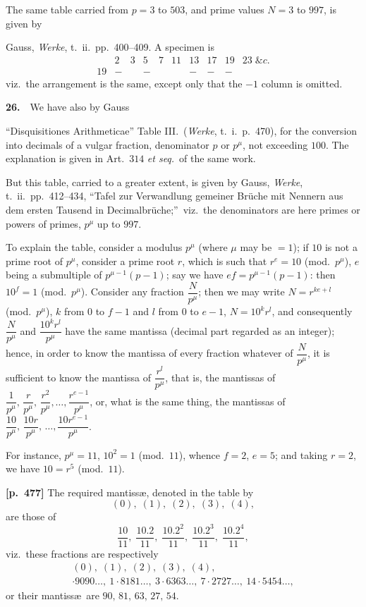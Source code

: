 \documentclass[11pt,a4paper]{article}
\begin{document}
The same table carried from $p=3$ to $503$, and prime values $N=3$ to $997$, is given by

Gauss, \textit{Werke}, t.~ii.\ pp.~400--409.   A specimen is
\[
\begin{array}{c|cccccccccc}
   & 2 & 3 & 5 & 7 & 11 & 13 & 17 & 19 & 23\;\&c. \\\hline
19 & - &   & - &   &    & -  & -  & -  &
\end{array}
\]
viz.\ the arrangement is the same, except only that the $-1$ column is omitted.

\textbf{26.}\ \ We have also by Gauss

``Disquisitiones Arithmeticae'' Table III.\ (\textit{Werke}, t.~i.\ p.~470), for the conversion into decimals of a vulgar fraction, denominator $p$ or $p^\mu$, not exceeding $100$.   The explanation is given in Art.\ $314$ \textit{et seq.}\ of the same work.

But this table, carried to a greater extent, is given by Gauss, \textit{Werke}, t.~ii.\ pp.~412--434, ``Tafel zur Verwandlung gemeiner Br\"uche mit Nennern aus dem ersten Tausend in Decimalbr\"uche;''\ viz.\ the denominators are here primes or powers of primes, $p^\mu$ up to $997$.

To explain the table, consider a modulus $p^\mu$ (where $\mu$ may be $=1$); if $10$ is not a prime root of $p^\mu$, consider a prime root $r$, which is such that $r^e=10$ (mod.\ $p^\mu$), $e$ being a submultiple of $p^{\mu-1}(p-1)$; say we have $ef=p^{\mu-1}(p-1)$: then $10^f=1$ (mod.\ $p^\mu$).   Consider any fraction $\dfrac{N}{p^\mu}$; then we may write $N=r^{ke+l}$ (mod.\ $p^\mu$), $k$ from $0$ to $f-1$ and $l$ from $0$ to $e-1$, $N=10^k r^l$, and consequently $\dfrac{N}{p^\mu}$ and $\dfrac{10^k r^l}{p^\mu}$ have the same mantissa (decimal part regarded as an integer); hence, in order to know the mantissa of every fraction whatever of $\dfrac{N}{p^\mu}$, it is sufficient to know the mantissa of $\dfrac{r^l}{p^\mu}$, that is, the mantissas of $\dfrac{1}{p^\mu},\,\dfrac{r}{p^\mu},\,\dfrac{r^2}{p^\mu},\ldots,\dfrac{r^{e-1}}{p^\mu}$, or, what is the same thing, the mantissas of $\dfrac{10}{p^\mu},\,\dfrac{10r}{p^\mu},\,\ldots,\dfrac{10r^{e-1}}{p^\mu}$.

For instance, $p^\mu=11$, $10^2=1$ (mod.\ $11$), whence $f=2$, $e=5$; and taking $r=2$, we have $10=r^5$ (mod.\ $11$).

\bigskip
\noindent\textbf{[p.~477]}\quad
The required mantiss\ae, denoted in the table by
\[
(0),\;(1),\;(2),\;(3),\;(4),
\]
are those of
\[
\frac{10}{11},\;\frac{10.2}{11},\;\frac{10.2^2}{11},\;\frac{10.2^3}{11},\;\frac{10.2^4}{11},
\]
viz.\ these fractions are respectively
\[
\begin{aligned}
(0),\;(1),\;(2),\;(3),\;(4),\\
\cdot 9090\ldots,\ 1\cdot 8181\ldots,\ 3\cdot 6363\ldots,\ 7\cdot 2727\ldots,\ 14\cdot 5454\ldots,
\end{aligned}
\]
or their mantiss\ae\ are $90,\,81,\,63,\,27,\,54$.
\end{document}
